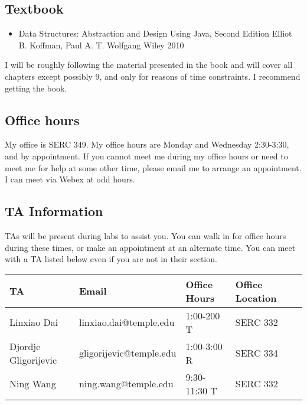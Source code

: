 \documentclass[10pt, letter]{article}
\begin{document}
\subsection*{Textbook}
\begin{itemize}
	\item Data Structures: Abstraction and Design Using Java, Second Edition Elliot B. Koffman, Paul A. T. Wolfgang Wiley 2010
\end{itemize}

I will be roughly following the material presented in the book and will cover all chapters except possibly 9, and only for reasons of time constraints.
I recommend getting the book.

\subsection*{Office hours}
My office is SERC 349.
My office hours are Monday and Wednesday 2:30-3:30, and by appointment.
If you cannot meet me during my office hours or need to meet me for help at some other time, please email me to arrange an appointment. 
I can meet via Webex at odd hours.

\subsection*{TA Information}

TAs will be present during labs to assist you.
You can walk in for office hours during these times, or make an appointment at an alternate time.
You can meet with a TA listed below even if you are not in their section.

{\footnotesize
	\begin{tabular}{l l l l l}
		TA & Email &Office Hours & Office Location \\ \hline
		Linxiao Dai & linxiao.dai@temple.edu & 1:00-200 T & SERC 332 \\
		Djordje Gligorijevic & gligorijevic@temple.edu & 1:00-3:00 R & SERC 334\\
		Ning Wang & ning.wang@temple.edu & 9:30-11:30 T & SERC 332\\
	\end{tabular}
}





\end{document}
